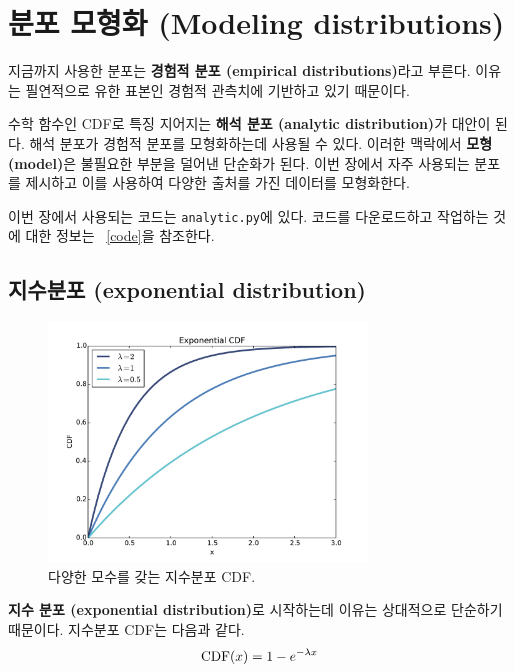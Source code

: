 \chapter{분포 모형화 (Modeling distributions)}
\label{modeling}

지금까지 사용한 분포는 {\bf 경험적 분포 (empirical distributions)}라고 부른다.
이유는 필연적으로 유한 표본인 경험적 관측치에 기반하고 있기 때문이다.


수학 함수인 CDF로 특징 지어지는 {\bf 해석 분포 (analytic distribution)}가 대안이 된다.
해석 분포가 경험적 분포를 모형화하는데 사용될 수 있다.
이러한 맥락에서 {\bf 모형(model)}은 불필요한 부분을 덜어낸 단순화가 된다.
이번 장에서 자주 사용되는 분포를 제시하고 이를 사용하여 다양한 출처를 가진 
데이터를 모형화한다.


이번 장에서 사용되는 코드는 {\tt analytic.py}에 있다.
코드를 다운로드하고 작업하는 것에 대한 정보는 ~\ref{code}을 참조한다.


\section{지수분포 (exponential distribution)}
\label{exponential}

\begin{figure}
\centerline{\includegraphics[height=2.5in]{figs/analytic_expo_cdf.pdf}}
\caption{다양한 모수를 갖는 지수분포 CDF.}
\label{analytic_expo_cdf}
\end{figure}

{\bf 지수 분포 (exponential distribution)}로 시작하는데 이유는 상대적으로 단순하기 때문이다.
지수분포 CDF는 다음과 같다.
%
\[ \mathrm{CDF}(x) = 1 - e^{-\lambda x} \]
%

